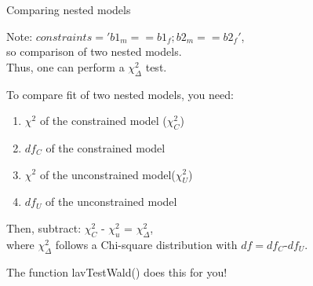 \documentclass[10pt]{beamer}\usepackage[]{graphicx}\usepackage[]{xcolor}
\begin{document}
%
% 
% 
% 
% 
% 
%
\begin{frame}[fragile]{Comparing nested models}

Note: $constraints = 'b1_m == b1_f; b2_m == b2_f'$,\\
so comparison of two nested models.\\
Thus, one can perform a ${\chi}^2_\Delta$ test.

\vspace{5mm}

To compare fit of two nested models, you need:
\begin{enumerate}
    \item ${\chi}^2$ of the constrained model (${\chi}^2_C$)
    \item $df_C$ of the constrained model
    \item ${\chi}^2$ of the unconstrained model(${\chi}^2_U$)
    \item $df_U$ of the unconstrained model 
\end{enumerate}

Then, subtract: ${\chi}^2_C$ - ${\chi}^2_u$ = ${\chi}^2_\Delta$,\\
where ${\chi}^2_\Delta$ follows a Chi-square distribution with $df = df_C$-$df_U$. 

\vspace{5mm}

The function lavTestWald() does this for you!

\end{frame}
\end{document}
